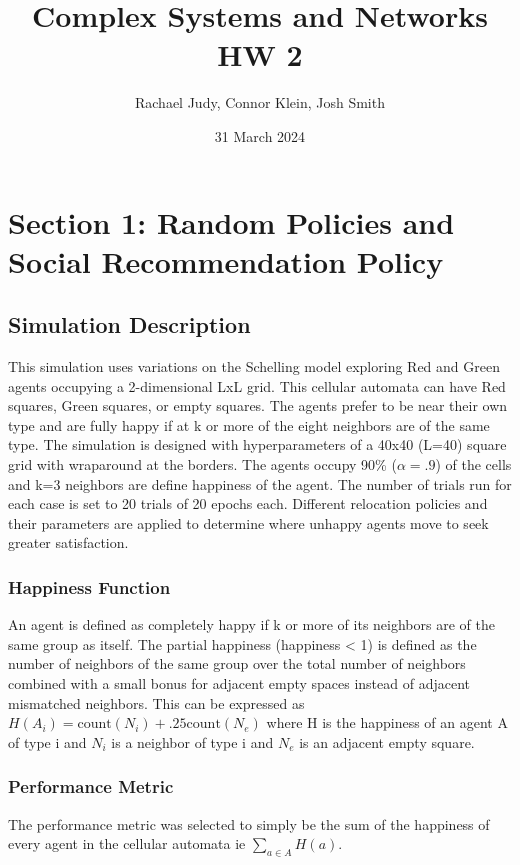 \documentclass[12pt]{article}
\title{Complex Systems and Networks HW 2}
\author{Rachael Judy, Connor Klein, Josh Smith}
\date{31 March 2024}
\begin{document}
	\pgfplotsset{compat=1.18}
	
	\maketitle
	
\section{Section 1: Random Policies and Social Recommendation Policy}\label{sec:q1}
\subsection{Simulation Description}\label{subsec:simulation}
This simulation uses variations on the Schelling model exploring Red and Green agents occupying a 2-dimensional LxL grid. This cellular automata can have Red squares, Green squares, or empty squares. The agents prefer to be near their own type and are fully happy if at k or more of the eight neighbors are of the same type. The simulation is designed with hyperparameters of a 40x40 (L=40) square grid with wraparound at the borders. The agents occupy 90\% ($\alpha=.9$) of the cells and k=3 neighbors are define happiness of the agent. The number of trials run for each case is set to 20 trials of 20 epochs each. Different relocation policies and their parameters are applied to determine where unhappy agents move to seek greater satisfaction.

\subsubsection{Happiness Function}
An agent is defined as completely happy if k or more of its neighbors are of the same group as itself. The partial happiness (happiness < 1) is defined as the number of neighbors of the same group over the total number of neighbors combined with a small bonus for adjacent empty spaces instead of adjacent mismatched neighbors. This can be expressed as $H(A_i) = \text{count}(N_i) + .25 \text{count}(N_e)$ where H is the happiness of an agent A of type i and $N_i$ is a neighbor of type i and $N_e$ is an adjacent empty square.

\subsubsection{Performance Metric}
The performance metric was selected to simply be the sum of the happiness of every agent in the cellular automata ie $\sum\limits_{a \in A} H(a)$.
\end{document}
